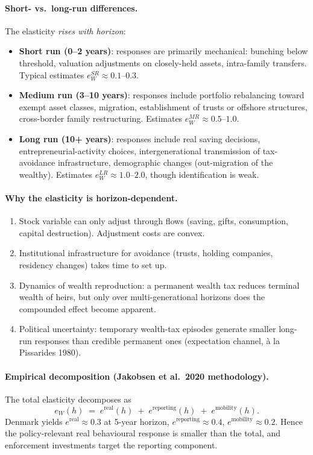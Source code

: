 \documentclass[11pt,a4paper]{article}
\begin{document}
\paragraph{Short- vs.\ long-run differences.}
The elasticity \emph{rises with horizon}:
\begin{itemize}[leftmargin=*,itemsep=2pt]
    \item \textbf{Short run (0--2 years)}: responses are primarily mechanical: bunching below threshold, valuation adjustments on closely-held assets, intra-family transfers. Typical estimates $e_{W}^{SR}\approx 0.1$--$0.3$.
    \item \textbf{Medium run (3--10 years)}: responses include portfolio rebalancing toward exempt asset classes, migration, establishment of trusts or offshore structures, cross-border family restructuring. Estimates $e_{W}^{MR}\approx 0.5$--$1.0$.
    \item \textbf{Long run (10+ years)}: responses include real saving decisions, entrepreneurial-activity choices, intergenerational transmission of tax-avoidance infrastructure, demographic changes (out-migration of the wealthy). Estimates $e_{W}^{LR}\approx 1.0$--$2.0$, though identification is weak.
\end{itemize}

\paragraph{Why the elasticity is horizon-dependent.}
\begin{enumerate}[leftmargin=*,itemsep=1pt]
    \item Stock variable can only adjust through flows (saving, gifts, consumption, capital destruction). Adjustment costs are convex.
    \item Institutional infrastructure for avoidance (trusts, holding companies, residency changes) takes time to set up.
    \item Dynamics of wealth reproduction: a permanent wealth tax reduces terminal wealth of heirs, but only over multi-generational horizons does the compounded effect become apparent.
    \item Political uncertainty: temporary wealth-tax episodes generate smaller long-run responses than credible permanent ones (expectation channel, à la Pissarides 1980).
\end{enumerate}

\paragraph{Empirical decomposition (Jakobsen et al.\ 2020 methodology).}
The total elasticity decomposes as
\[
e_{W}(h)\;=\;e^{\text{real}}(h)\;+\;e^{\text{reporting}}(h)\;+\;e^{\text{mobility}}(h).
\]
Denmark yields $e^{\text{real}}\!\approx\!0.3$ at 5-year horizon, $e^{\text{reporting}}\!\approx\!0.4$, $e^{\text{mobility}}\!\approx\!0.2$. Hence the policy-relevant real behavioural response is smaller than the total, and enforcement investments target the reporting component.
\end{document}
